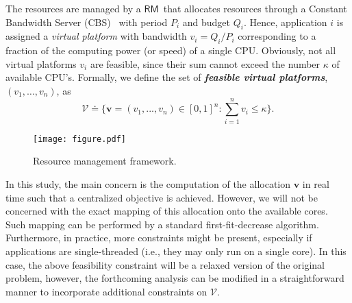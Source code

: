 \documentclass[letter,11pt]{article}
\begin{document}
The resources are managed by a {$\mathsf{RM}$}\ that allocates resources through a Constant Bandwidth Server (CBS)~\cite{Abe98a} with period $P_i$ and budget $Q_i$. Hence, application $i$ is assigned a \emph{virtual platform} with bandwidth $v_i=Q_i/P_i$ corresponding to a fraction of the computing power (or speed) of a single CPU. 
Obviously, not all virtual platforms $v_i$ are feasible, since their sum cannot exceed the number $\kappa$ of
available CPU's. Formally, we define the set of \textit{\textbf{feasible virtual platforms}}, $(v_1,\ldots,v_n)$, as
\begin{equation}
  \label{eq:feasibleVPs}
  {\mathcal{V}} {\doteq} \Big\{{\mathbf{v}}=(v_1,...,v_n)\in[0,1]^n:\sum_{i=1}^nv_i\leq \kappa\Big\}.
\end{equation}
\begin{figure}[t]
  \centering
  
  
  
  
  
  
  
  
  
  
  
  
  
  
  
  
  
  
  
  
  
  
  
  
  \texttt{[image: figure.pdf]}
  \caption{Resource management framework.}
  \label{fig:framework}
\end{figure}

In this study, the main concern is the computation of the allocation ${\mathbf{v}}$ in real time such that a centralized objective is achieved. However, we will not be concerned with the exact mapping of this allocation onto the available cores. Such mapping can be performed by a standard first-fit-decrease algorithm. Furthermore, in practice, more constraints might be present, especially if applications are single-threaded (i.e., they may only run on a single core). In this case, the above feasibility constraint will be a relaxed version of the original problem, however, the forthcoming analysis can be modified in a straightforward manner to incorporate additional constraints on ${\mathcal{V}}$.
\end{document}
